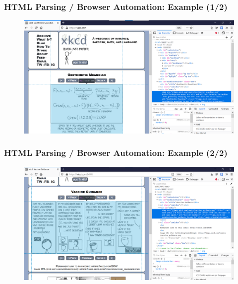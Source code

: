\documentclass[10pt, aspectratio=1610, natbib, handout]{beamer}
\begin{document}
  \begin{frame}
    \frametitle{HTML Parsing / Browser Automation: Example (1/2)}

    \begin{figure}
      \centering
      \includegraphics[width=\textwidth]{./assets/xkcd-home.png}
    \end{figure}

    \vfill


  \end{frame}

  \begin{frame}
    \frametitle{HTML Parsing / Browser Automation: Example (2/2)}

    \begin{figure}
      \centering
      \includegraphics[width=\textwidth]{./assets/xkcd-2434.png}
    \end{figure}

    \vfill


  \end{frame}
\end{document}
